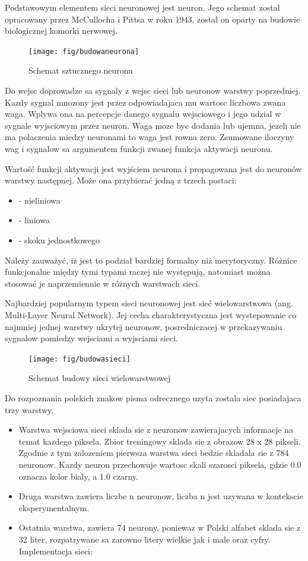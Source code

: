\documentclass[brudnopis]{xmgr}
\begin{document}
Podstawowym elementem sieci neuronowej jest neuron. Jego schemat zostal opracowany przez McCullocha i Pittsa w roku 1943, zostal on oparty na budowie biologicznej komorki nerwowej.

\begin{figure}[!tbh]
\centering
\texttt{[image: fig/budowaneurona]}
\caption{Schemat sztucznego neuronu}
\end{figure}
\newpage

Do wejsc doprowadze sa sygnaly z wejsc sieci lub neuronow warstwy poprzedniej. Kazdy sygnal mnozony jest przez odpowiadajaca mu wartosc liczbowa zwana waga. Wplywa ona na percepcje danego sygnalu wejsciowego i jego udzial w sygnale wyjsciowym przez neuron. Waga moze byc dodania lub ujemna, jezeli nie ma polaczenia miedzy neuronami to waga jest rowna zero. Zsumowane iloczyny wag i sygnalow sa argumentem funkcji zwanej funkcja aktywacji neuronu.

Wartość funkcji aktywacji jest wyjściem neurona i propagowana jest do neuronów warstwy następnej. Może ona przybierać jedną z trzech postaci:
\begin{itemize}
\item
- nieliniowa
\item
- liniowa
\item
- skoku jednostkowego
\end{itemize}

Należy zauważyć, iż jest to podział bardziej formalny niż merytoryczny. Różnice funkcjonalne między tymi typami raczej nie występują, natomiast można stosować je naprzemiennie w różnych warstwach sieci.

Najbardziej popularnym typem sieci neuronowej jest sieć wielowarstwowa (ang. Multi-Layer Neural Network). Jej cecha charakterystyczna jest wystepowanie co najmniej jednej warstwy ukrytej neuronow, posredniczacej w przekazywaniu sygnalow pomiedzy wejsciami a wyjsciami sieci.

\begin{figure}[!tbh]
\centering
\texttt{[image: fig/budowasieci]}
\caption{Schemat budowy sieci wielowarstwowej}
\end{figure}
\newpage

Do rozpoznania polskich znakow pisma odrecznego uzyta zostala siec posiadajaca trzy warstwy.

\begin{itemize}
\item
Warstwa wejsciowa sieci sklada sie z neuronow zawierajacych informacje na temat kazdego piksela. Zbior treningowy sklada sie z obrazow 28 x 28 pikseli. Zgodnie z tym zalozeniem pierwsza warstwa sieci bedzie skladala sie z 784 neuronow. Kazdy neuron przechowuje wartosc skali szarosci piksela, gdzie 0.0 oznacza kolor bialy, a 1.0 czarny.
\item
Druga warstwa zawiera liczbe n neuronow, liczba n jest uzywana w kontekscie eksperymentalnym.
\item
Ostatnia warstwa, zawiera 74 neurony, poniewaz w Polski alfabet sklada sie z 32 liter, rozpatrywane sa zarowno litery wielkie jak i male oraz cyfry. Implementacja sieci:
\end{itemize}
\end{document}
